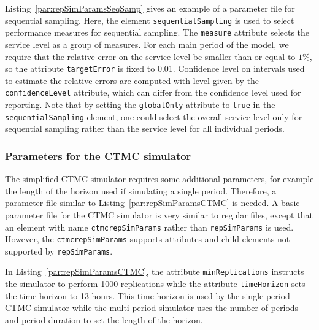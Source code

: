 Listing~\ref{par:repSimParamsSeqSamp} gives an example of a parameter
file for sequential sampling. Here, the element
\texttt{sequential\-Sampling} is used to select
performance measures for sequential sampling.
The \texttt{measure} attribute selects the service level as a group of measures.
For each main period of the model, we require that the relative error on
the service level be smaller than or equal to $1\%$, so the
attribute \texttt{target\-Error} is fixed to 0.01.
Confidence level on intervals used to estimate the relative errors are
computed with level given by the \texttt{confidence\-Level} attribute,
which can differ from the confidence level used for reporting.
Note that by setting the \texttt{global\-Only} attribute to
\texttt{true} in the \texttt{sequential\-Sampling} element, one could
select the overall service level only for sequential sampling rather
than the service level for all individual periods.



\subsubsection{Parameters for the CTMC simulator}

The simplified CTMC simulator requires some additional parameters, for
example the length of the horizon used if simulating a single period.
Therefore, a parameter file similar to
Listing~\ref{par:repSimParamsCTMC} is needed.
A basic parameter file for the CTMC simulator is very similar to
regular files, except that an element with name
\texttt{ctmcrep\-Sim\-Params} rather than \texttt{rep\-Sim\-Params} is
used.
However, the \texttt{ctmcrep\-Sim\-Params} supports attributes and
child elements not supported by \texttt{rep\-Sim\-Params}.



In Listing~\ref{par:repSimParamsCTMC}, the attribute
\texttt{min\-Replications} instructs the simulator to perform 1000
replications while the attribute \texttt{time\-Horizon} sets the time
horizon to 13 hours. This time horizon is used by the single-period
CTMC simulator while the multi-period simulator uses the number of
periods and period duration to set the length of the horizon.

